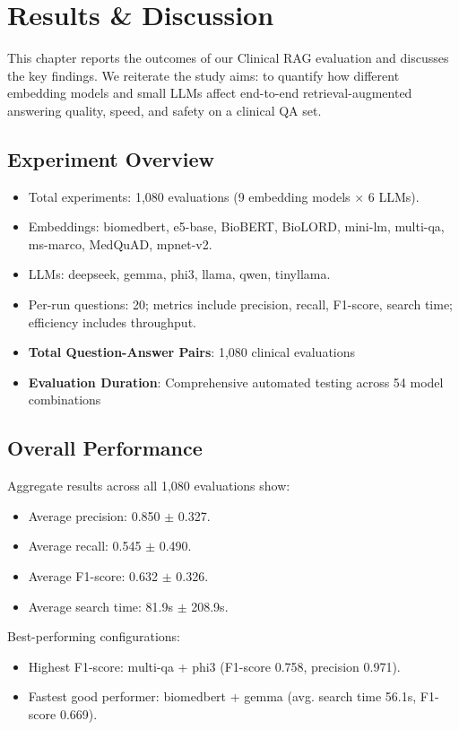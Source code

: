 \chapter{Results \& Discussion}
\label{chap:results}

\noindent This chapter reports the outcomes of our Clinical RAG evaluation and discusses the key findings. We reiterate the study aims: to quantify how different embedding models and small LLMs affect end-to-end retrieval-augmented answering quality, speed, and safety on a clinical QA set.

\section{Experiment Overview}
\begin{itemize}
  \item Total experiments: 1,080 evaluations (9 embedding models \(\times\) 6 LLMs).
  \item Embeddings: biomedbert, e5-base, BioBERT, BioLORD, mini-lm, multi-qa, ms-marco, MedQuAD, mpnet-v2.
  \item LLMs: deepseek, gemma, phi3, llama, qwen, tinyllama.
  \item Per-run questions: 20; metrics include precision, recall, F1-score, search time; efficiency includes throughput.
  \item \textbf{Total Question-Answer Pairs}: 1,080 clinical evaluations
  \item \textbf{Evaluation Duration}: Comprehensive automated testing across 54 model combinations
\end{itemize}
\section{Overall Performance}
Aggregate results across all 1,080 evaluations show:
\begin{itemize}
  \item Average precision: 0.850 $\pm$ 0.327.
  \item Average recall: 0.545 $\pm$ 0.490.
  \item Average F1-score: 0.632 $\pm$ 0.326.
  \item Average search time: 81.9s $\pm$ 208.9s.
\end{itemize}
\newpage
Best-performing configurations:
\begin{itemize}
  \item Highest F1-score: multi-qa + phi3 (F1-score 0.758, precision 0.971).
  \item Fastest good performer: biomedbert + gemma (avg. search time 56.1s, F1-score 0.669).
\end{itemize}
